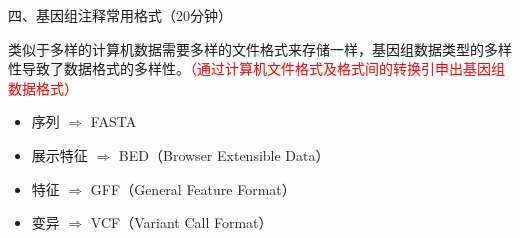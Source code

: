 \documentclass{TIJMUjiaoanLL}
\begin{document}
\otherTail
\newpage
\otherHeader


\noindent
四、基因组注释常用格式（20分钟）

类似于多样的计算机数据需要多样的文件格式来存储一样，基因组数据类型的多样性导致了数据格式的多样性。\textcolor{red}{（通过计算机文件格式及格式间的转换引申出基因组数据格式）}
\begin{itemize}
  \item 序列 $\Rightarrow$ FASTA
  \item 展示特征 $\Rightarrow$ BED（Browser Extensible Data）
  \item 特征 $\Rightarrow$ GFF（General Feature Format）
  \item 变异 $\Rightarrow$ VCF（Variant Call Format）
\end{itemize}
\end{document}
